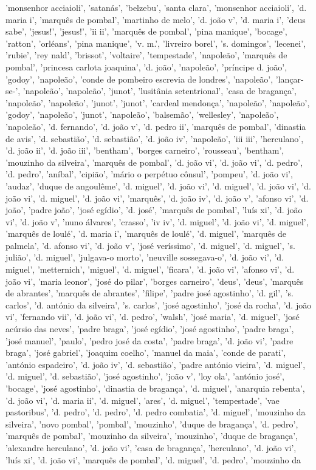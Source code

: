 \documentclass{article}
\begin{document}
\begin{itemize}
'monsenhor acciaioli', 'satanás', 'belzebu', 'santa clara', 'monsenhor acciaioli', 'd. maria i', 'marquês de pombal', 'martinho de melo', 'd. joão v', 'd. maria i', 'deus sabe', 'jesus!', 'jesus!', 'ii ii', 'marquês de pombal', 'pina manique', 'bocage', 'ratton', 'orléans', 'pina manique', 'v. m.', 'livreiro borel', 's. domingos', 'lecenei', 'rubie', 'rey nald', 'brissot', 'voltaire', 'tempestade', 'napoleão', 'marquês de pombal', 'princesa carlota joaquina', 'd. joão', 'napoleão', 'príncipe d. joão', 'godoy', 'napoleão', 'conde de pombeiro escrevia de londres', 'napoleão', 'lançar-se-', 'napoleão', 'napoleão', 'junot', 'lusitânia setentrional', 'casa de bragança', 'napoleão', 'napoleão', 'junot', 'junot', 'cardeal mendonça', 'napoleão', 'napoleão', 'godoy', 'napoleão', 'junot', 'napoleão', 'balsemão', 'wellesley', 'napoleão', 'napoleão', 'd. fernando', 'd. joão v', 'd. pedro ii', 'marquês de pombal', 'dinastia de avis', 'd. sebastião', 'd. sebastião', 'd. joão iv', 'napoleão', 'iii iii', 'herculano', 'd. joão ii', 'd. joão iii', 'bentham', 'borges carneiro', 'rousseau', 'bentham', 'mouzinho da silveira', 'marquês de pombal', 'd. joão vi', 'd. joão vi', 'd. pedro', 'd. pedro', 'aníbal', 'cipião', 'mário o perpétuo cônsul', 'pompeu', 'd. joão vi', 'audaz', 'duque de angoulême', 'd. miguel', 'd. joão vi', 'd. miguel', 'd. joão vi', 'd. joão vi', 'd. miguel', 'd. joão vi', 'marquês', 'd. joão iv', 'd. joão v', 'afonso vi', 'd. joão', 'padre joão', 'josé egídio', 'd. josé', 'marquês de pombal', 'luís xi', 'd. joão vi', 'd. joão v', 'nuno álvares', 'crasso', 'iv iv', 'd. miguel', 'd. joão vi', 'd. miguel', 'marquês de loulé', 'd. maria i', 'marquês de loulé', 'd. miguel', 'marquês de palmela', 'd. afonso vi', 'd. joão v', 'josé veríssimo', 'd. miguel', 'd. miguel', 's. julião', 'd. miguel', 'julgava-o morto', 'neuville sossegava-o', 'd. joão vi', 'd. miguel', 'metternich', 'miguel', 'd. miguel', 'ficara', 'd. joão vi', 'afonso vi', 'd. joão vi', 'maria leonor', 'josé do pilar', 'borges carneiro', 'deus', 'deus', 'marquês de abrantes', 'marquês de abrantes', 'filipe', 'padre josé agostinho', 'd. gil', 's. carlos', 'd. antónio da silveira', 's. carlos', 'josé agostinho', 'josé da rocha', 'd. joão vi', 'fernando vii', 'd. joão vi', 'd. pedro', 'walsh', 'josé maria', 'd. miguel', 'josé acúrsio das neves', 'padre braga', 'josé egídio', 'josé agostinho', 'padre braga', 'josé manuel', 'paulo', 'pedro josé da costa', 'padre braga', 'd. joão vi', 'padre braga', 'josé gabriel', 'joaquim coelho', 'manuel da maia', 'conde de parati', 'antónio espadeiro', 'd. joão iv', 'd. sebastião', 'padre antónio vieira', 'd. miguel', 'd. miguel', 'd. sebastião', 'josé agostinho', 'joão v', 'loy ola', 'antónio josé', 'bocage', 'josé agostinho', 'dinastia de bragança', 'd. miguel', 'anarquia rebenta', 'd. joão vi', 'd. maria ii', 'd. miguel', 'ares', 'd. miguel', 'tempestade', 'vae pastoribus', 'd. pedro', 'd. pedro', 'd. pedro combatia', 'd. miguel', 'mouzinho da silveira', 'novo pombal', 'pombal', 'mouzinho', 'duque de bragança', 'd. pedro', 'marquês de pombal', 'mouzinho da silveira', 'mouzinho', 'duque de bragança', 'alexandre herculano', 'd. joão vi', 'casa de bragança', 'herculano', 'd. joão vi', 'luís xi', 'd. joão vi', 'marquês de pombal', 'd. miguel', 'd. pedro', 'mouzinho da 
\end{itemize}
\end{document}
